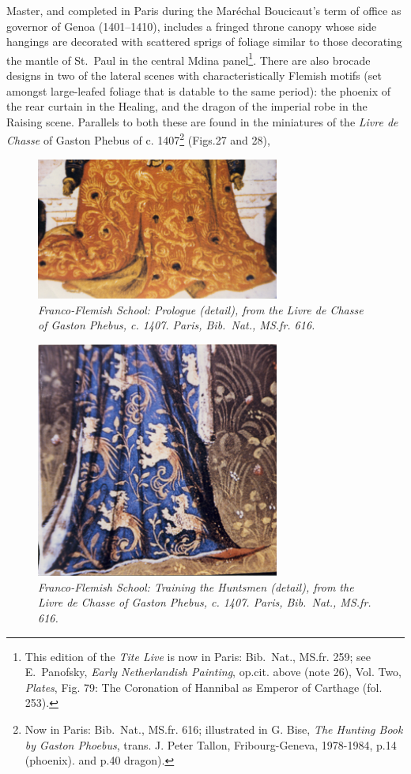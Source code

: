 \documentclass[a4paper,12pt]{article}
\begin{document}
Master, and completed in Paris during the Mar\'echal Boucicaut's term of
office as governor of Genoa (1401--1410), includes a fringed throne
canopy whose side hangings are decorated with scattered sprigs of
foliage similar to those decorating the mantle of St.~Paul in the
central Mdina panel\footnote{This edition of the \textit{Tite Live} is
now in Paris: Bib.~Nat., MS.fr. 259; see E.~Panofsky, \textit{Early
Netherlandish Painting}, op.cit. above (note 26), Vol. Two,
\textit{Plates}, Fig. 79: The Coronation of Hannibal as Emperor of
Carthage (fol. 253).}. There are also brocade designs in two of the
lateral scenes with characteristically Flemish motifs (set amongst
large-leafed foliage that is datable to the same period): the phoenix
of the rear curtain in the Healing, and the dragon of the imperial
robe in the Raising scene. Parallels to both these are found in the
miniatures of the \textit{Livre de Chasse} of Gaston Phebus of
c. 1407\footnote{Now in Paris: Bib.~Nat., MS.fr. 616; illustrated in
G. Bise, \textit{The Hunting Book by Gaston Phoebus}, trans. J. Peter
Tallon, Fribourg-Geneva, 1978-1984, p.14 (phoenix). and p.40 dragon).}
(Figs.27 and 28), 
\begin{figure}[htbp]
\centering
\includegraphics[width=8cm]{pics/fig27.png}
\caption[Franco-Flemish School: Prologue (detail)] 
{\it Franco-Flemish School: Prologue (detail), from the \textit{Livre de
Chasse} of Gaston Phebus, c. 1407.  Paris, Bib.~Nat., MS.fr. 616.}
\end{figure}
\begin{figure}[htbp]
\centering
\includegraphics[width=8cm]{pics/fig28.png}
\caption[Franco-Flemish School: Training the Huntsmen (detail)] 
{\it Franco-Flemish School: Training the Huntsmen (detail), from the
\textit{Livre de Chasse} of Gaston Phebus, c. 1407.  Paris,
Bib.~Nat., MS.fr. 616.}
\end{figure}
\end{document}
